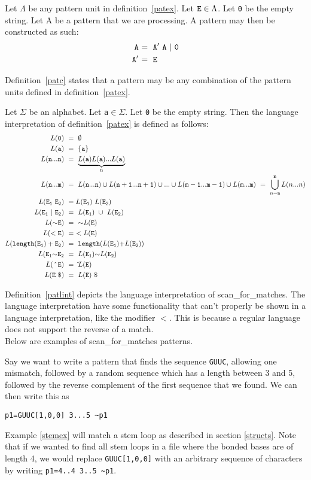 \begin{mydef}\label{patc}
Let $\Lambda$ be any pattern unit in definition~\ref{patex}. Let ${\tt E}\in\Lambda$.
Let {\tt 0} be the empty string. Let A be a pattern that we are processing.
A pattern may then be constructed as such: 
\begin{align*}
{\tt A~} &{\tt =~A'~A~|~0}\\
{\tt A'~} &{\tt=~E}
\end{align*}
\end{mydef}
Definition~\ref{patc} states that a pattern may be any combination of the pattern 
units defined in definition~\ref{patex}.
\begin{mydef}\label{patlint}
Let $\Sigma$ be an alphabet. Let {\tt a$\in\Sigma$}. Let {\tt 0} be the empty 
string.
Then the language interpretation of definition~\ref{patex} is defined as follows:
\begin{align*}
L({\tt 0})~&=~\emptyset\\
L({\tt a})~&=~\{{\tt a}\}\\
L({\tt n...n})~&=~\underbrace{L({\tt a})L({\tt a})...L({\tt a})}_\text{n}\\
L({\tt n...m})~&=~L({\tt n...n})\cup L({\tt n+1...n+1})\cup...\cup L({\tt m-1...m-1})\cup L({\tt m...m})~=~\bigcup\limits_{n={\tt n}}^{\tt m} L(n...n)\\
L({\tt E_1~E_2})~&=L({\tt E_1})~L({\tt E_2})\\
L({\tt E_1~|~E_2})~&=~L({\tt E}_{\tt 1})~\cup~L({\tt E}_{\tt 2})\\
L({\tt {\sim}E})~&=~{\sim}L({\tt E})\\
L({\tt <E})~&=~<L({\tt E})\\
L({\tt length(E_ 1 )+ E_2} )~&=~{\tt length(}L({\tt E_1}){\tt+} L({\tt E_2 )})\\
L({\tt E_1{\sim}E_2}~&=~L({\tt E_1}){\sim}L({\tt E_2})\\
L({\tt~\hat{}~E})~&=~\hat{} L({\tt E})\\
L({\tt E~\$})~&=~L({\tt E})~\$
\end{align*}
\end{mydef}
Definition~\ref{patlint} depicts the language interpretation of scan\_for\_matches.
The language interpretation have some functionality that can't properly be 
shown in a language interpretation, like the modifier $<$. This is because 
a regular language does not support the reverse of a match. 
\\Below are examples of scan\_for\_matches patterns.
\begin{myex}\label{stemex}
Say we want to write a pattern that finds the sequence {\tt GUUC}, allowing 
one mismatch, followed by a random sequence which has a length between 3 and 5, 
followed by the reverse complement of the first sequence that we found. We can 
then write this as \begin{center}
{\tt p1=GUUC[1,0,0] 3...5 \textasciitilde p1}
\end{center}
\end{myex}
Example \ref{stemex} will match a stem loop as described in section 
\ref{structs}. Note that if we wanted to find all stem loops in a file where 
the bonded bases are of length 
4, we would replace {\tt GUUC[1,0,0]} with an arbitrary sequence of characters 
by writing {\tt p1=4..4 3..5 \textasciitilde p1}. 
